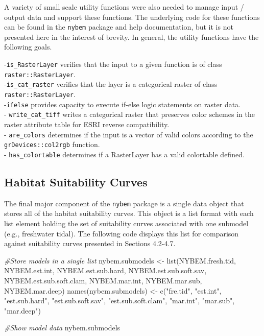 \documentclass[
]{book}
\newenvironment{Shaded}{\begin{snugshade}}{\end{snugshade}}
\newcommand{\CommentTok}[1]{\textcolor[rgb]{0.56,0.35,0.01}{\textit{#1}}}
\newcommand{\FunctionTok}[1]{\textcolor[rgb]{0.00,0.00,0.00}{#1}}
\newcommand{\NormalTok}[1]{#1}
\newcommand{\OtherTok}[1]{\textcolor[rgb]{0.56,0.35,0.01}{#1}}
\newcommand{\StringTok}[1]{\textcolor[rgb]{0.31,0.60,0.02}{#1}}
\begin{document}
A variety of small scale utility functions were also needed to manage input / output data and support these functions. The underlying code for these functions can be found in the \texttt{nybem} package and help documentation, but it is not presented here in the interest of brevity. In general, the utility functions have the following goals.

-\texttt{is\_RasterLayer} verifies that the input to a given function is of class \texttt{raster::RasterLayer}.\\
-\texttt{is\_cat\_raster} verifies that the layer is a categorical raster of class \texttt{raster::RasterLayer}.\\
-\texttt{ifelse} provides capacity to execute if-else logic statements on raster data.\\
- \texttt{write\_cat\_tiff} writes a categorical raster that preserves color schemes in the raster attribute table for ESRI reverse compatibility.\\
- \texttt{are\_colors} determines if the input is a vector of valid colors according to the \texttt{grDevices::col2rgb} function.\\
- \texttt{has\_colortable} determines if a RasterLayer has a valid colortable defined.

\hypertarget{habitat-suitability-curves}{%
\subsection{Habitat Suitability Curves}\label{habitat-suitability-curves}}

The final major component of the \texttt{nybem} package is a single data object that stores all of the habitat suitability curves. This object is a list format with each list element holding the set of suitability curves associated with one submodel (e.g., freshwater tidal). The following code displays this list for comparison against suitability curves presented in Sections 4.2-4.7.

\begin{Shaded}
\begin{Highlighting}[]
\CommentTok{\#Store models in a single list}
\NormalTok{nybem.submodels }\OtherTok{\textless{}{-}} \FunctionTok{list}\NormalTok{(NYBEM.fresh.tid, NYBEM.est.int, }
\NormalTok{                        NYBEM.est.sub.hard, NYBEM.est.sub.soft.sav, NYBEM.est.sub.soft.clam,}
\NormalTok{                        NYBEM.mar.int, NYBEM.mar.sub, NYBEM.mar.deep)}
\FunctionTok{names}\NormalTok{(nybem.submodels) }\OtherTok{\textless{}{-}} \FunctionTok{c}\NormalTok{(}\StringTok{"fre.tid"}\NormalTok{, }\StringTok{"est.int"}\NormalTok{, }
                            \StringTok{"est.sub.hard"}\NormalTok{, }\StringTok{"est.sub.soft.sav"}\NormalTok{, }\StringTok{"est.sub.soft.clam"}\NormalTok{, }
                            \StringTok{"mar.int"}\NormalTok{, }\StringTok{"mar.sub"}\NormalTok{, }\StringTok{"mar.deep"}\NormalTok{)}

\CommentTok{\#Show model data}
\NormalTok{nybem.submodels}
\end{Highlighting}
\end{Shaded}
\end{document}
